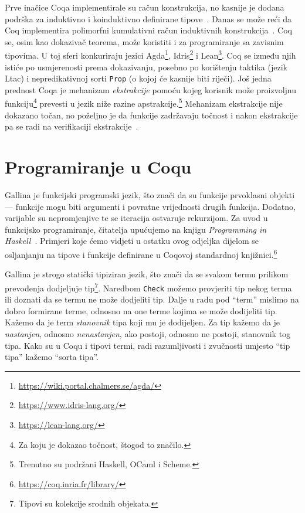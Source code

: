 Prve inačice Coqa implementirale su račun konstrukcija, no kasnije je dodana podrška za induktivno i koinduktivno definirane tipove~\cite{cic, coinductive}.
Danas se može reći da Coq implementira polimorfni kumulativni račun induktivnih konstrukcija~\cite{coqcoqcorrect}.
Coq se, osim kao dokazivač teorema, može koristiti i za programiranje sa zavisnim tipovima.
U toj sferi konkuriraju jezici Agda\footnote{\url{https://wiki.portal.chalmers.se/agda/}}, Idris\footnote{\url{https://www.idris-lang.org/}} i Lean\footnote{\url{https://lean-lang.org/}}. Coq se između njih istiće po usmjerenosti prema dokazivanju, posebno po korištenju taktika (jezik Ltac) i nepredikativnoj sorti \texttt{Prop} (o kojoj će kasnije biti riječi).
Još jedna prednost Coqa je mehanizam \textit{ekstrakcije} pomoću kojeg korisnik može proizvoljnu funkciju\footnote{Za koju je dokazao točnost, štogod to značilo.} prevesti u jezik niže razine apstrakcije.\footnote{Trenutno su podržani Haskell, OCaml i Scheme.}
Mehanizam ekstrakcije nije dokazano točan, no poželjno je da funkcije zadržavaju točnost i nakon ekstrakcije pa se radi na verifikaciji ekstrakcije~\cite{coqcoqcorrect}.

\section{Programiranje u Coqu}\label{sec:programiranje-u-gallini}
Gallina je funkcijski programski jezik, što znači da su funkcije prvoklasni objekti ---
funkcije mogu biti argumenti i povratne vrijednosti drugih funkcija.
Dodatno, varijable su nepromjenjive  te se iteracija ostvaruje rekurzijom.
Za uvod u funkcijsko programiranje, čitatelja upućujemo na knjigu \textit{Programming in Haskell}~\cite{Hutton_2016}.
Primjeri koje ćemo vidjeti u ostatku ovog odjeljka dijelom se osljanjanju na tipove i funkcije definirane u Coqovoj standardnoj knjižnici.\footnote{\url{https://coq.inria.fr/library/}}

Gallina je strogo statički tipiziran jezik, što znači da se svakom termu prilikom prevođenja dodjeljuje tip\footnote{Tipovi su kolekcije srodnih objekata.}.
Naredbom \texttt{Check} možemo provjeriti tip nekog terma ili doznati da se termu ne može dodjeliti tip.
Dalje u radu pod ``term'' mislimo na dobro formirane terme, odnosno na one terme kojima se može dodijeliti tip.
Kažemo da je term \textit{stanovnik} tipa koji mu je dodijeljen.
Za tip kažemo da je \textit{nastanjen}, odnosno \textit{nenastanjen}, ako postoji, odnosno ne postoji, stanovnik tog tipa.
Kako su u Coqu i tipovi termi, radi razumljivosti i zvučnosti umjesto ``tip tipa'' kažemo ``sorta tipa''.

